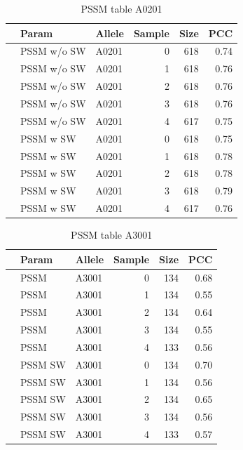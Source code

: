 \begin{table}[ht]
\begin{center}
\begin{tabular}{rllrrr}
  \hline
 & Param & Allele & Sample & Size & PCC \\ 
  \hline
 & PSSM w/o SW & A0201 &   0 & 618 & 0.74 \\ 
 & PSSM w/o SW & A0201 &   1 & 618 & 0.76 \\ 
 & PSSM w/o SW & A0201 &   2 & 618 & 0.76 \\ 
 & PSSM w/o SW & A0201 &   3 & 618 & 0.76 \\ 
 & PSSM w/o SW & A0201 &   4 & 617 & 0.75 \\ 
\hline
 & PSSM w SW & A0201 &   0 & 618 & 0.75 \\ 
 & PSSM w SW & A0201 &   1 & 618 & 0.78 \\ 
 & PSSM w SW & A0201 &   2 & 618 & 0.78 \\ 
 & PSSM w SW & A0201 &   3 & 618 & 0.79 \\ 
 & PSSM w SW & A0201 &   4 & 617 & 0.76 \\ 
   \hline
\end{tabular}
\end{center}
\caption{PSSM table A0201}\label{tab:pssm1}
\end{table}

\begin{table}[ht]
\begin{center}
\begin{tabular}{rllrrr}
  \hline
 & Param & Allele & Sample & Size & PCC \\ 
  \hline
   & PSSM & A3001 &   0 & 134 & 0.68 \\ 
   & PSSM & A3001 &   1 & 134 & 0.55 \\ 
   & PSSM & A3001 &   2 & 134 & 0.64 \\ 
   & PSSM & A3001 &   3 & 134 & 0.55 \\ 
   & PSSM & A3001 &   4 & 133 & 0.56 \\ 
  \hline
   & PSSM SW & A3001 &   0 & 134 & 0.70 \\ 
   & PSSM SW & A3001 &   1 & 134 & 0.56 \\ 
   & PSSM SW & A3001 &   2 & 134 & 0.65 \\ 
   & PSSM SW & A3001 &   3 & 134 & 0.56 \\ 
   & PSSM SW & A3001 &   4 & 133 & 0.57 \\ 
   \hline
\end{tabular}
\end{center}
\caption{PSSM table A3001}\label{tab:pssm2}
\end{table}

